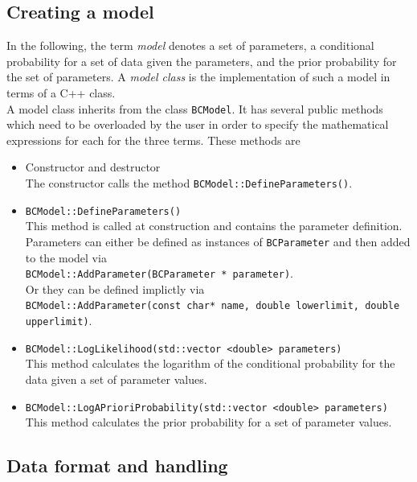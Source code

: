 \documentclass[11pt, a4paper]{article}
\begin{document}

\subsection{Creating a model} 

In the following, the term {\it model} denotes a set of parameters, a
conditional probability for a set of data given the parameters, and
the prior probability for the set of parameters. A {\it model class}
is the implementation of such a model in terms of a C++ class. \\ 

\noindent 
A model class inherits from the class \verb|BCModel|. It has several
public methods which need to be overloaded by the user in order to
specify the mathematical expressions for each for the three
terms. These methods are
% 
\begin{itemize}
\item Constructor and destructor \\ 
 The constructor calls the method \verb|BCModel::DefineParameters()|.
% 
\item \verb|BCModel::DefineParameters()| \\
 This method is called at construction and contains the parameter
 definition. Parameters can either be defined as instances of
 \verb|BCParameter| and then added to the model via \\
 \verb|BCModel::AddParameter(BCParameter * parameter)|. \\ Or they can
 be defined implictly via \\ 
 \verb|BCModel::AddParameter(const char* name, double lowerlimit, double upperlimit)|.
% 
\item \verb|BCModel::LogLikelihood(std::vector <double> parameters)| \\ 
 This method calculates the logarithm of the conditional probability
 for the data given a set of parameter values. 
%
\item \verb|BCModel::LogAPrioriProbability(std::vector <double> parameters)| \\
 This method calculates the prior probability for a set of parameter
 values. 
\end{itemize} 


\subsection{Data format and handling} 
\end{document}
